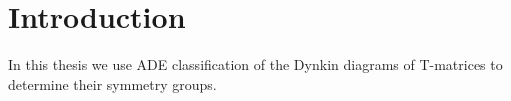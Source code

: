 \documentclass{article}
\begin{document}
\section{Introduction}

In this thesis we use ADE classification of the Dynkin diagrams of T-matrices
to determine their symmetry groups.
\end{document}
